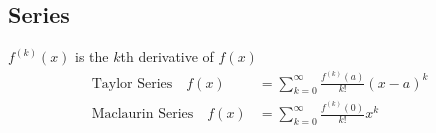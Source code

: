 \documentclass{article}
\begin{document}
\begin{multicols*}{2}
    \subsection*{Series}
    $f^{(k)}(x)$ is the $k$th derivative of $f(x)$
    \begin{align*}
        \text{Taylor Series} \quad f(x) &= \sum_{k=0}^{\infty} \frac{f^{(k)}(a)}{k!} (x-a)^k \\
        \text{Maclaurin Series} \quad f(x) &= \sum_{k=0}^{\infty} \frac{f^{(k)}(0)}{k!} x^k \\
    \end{align*}

\end{multicols*}
\end{document}
